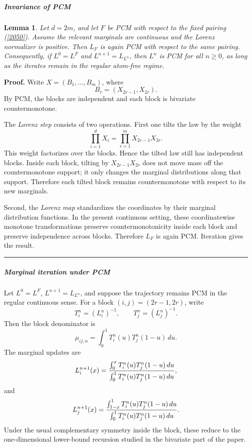 \documentclass[onecolumn]{article}
\newtheorem{lemma}[theorem]{Lemma}
\newenvironment{proof}[1][Proof]{\noindent\textbf{#1.} }{\ \rule{0.5em}{0.5em}}
\begin{document}
\subparagraph{Invariance of PCM}

\begin{lemma}
\noindent \label{PCM-invariance} Let $d=2m$, and let $F$ be PCM with respect
to the fixed pairing (\ref{2050}). Assume the relevant marginals are
continuous and the Lorenz normalizer is positive. Then $L_{F}$ is again PCM
with respect to the same pairing. Consequently, if $L^{0}=L^{F}$ and $%
L^{n+1}=L_{L^{n}}$, then $L^{n}$ is PCM for all $n\geq 0$, as long as the
iterates remain in the regular atom-free regime. \medskip
\end{lemma}

\begin{proof}
Write $X=(B_{1},\ldots ,B_{m})$, where 
\begin{equation*}
B_{r}=(X_{2r-1},X_{2r}).
\end{equation*}%
By PCM, the blocks are independent and each block is bivariate
countermonotone.

The \textit{Lorenz step} consists of two operations. First one tilts the law
by the weight 
\begin{equation*}
\prod_{i=1}^{d}X_{i}=\prod_{r=1}^{m}X_{2r-1}X_{2r}.
\end{equation*}%
This weight factorizes over the blocks. Hence the tilted law still has
independent blocks. Inside each block, tilting by $X_{2r-1}X_{2r}$ does not
move mass off the countermonotone support; it only changes the marginal
distributions along that support. Therefore each tilted block remains
countermonotone with respect to its new marginals.

Second, the \textit{Lorenz map} standardizes the coordinates by their
marginal distribution functions. In the present continuous setting, these
coordinatewise monotone transformations preserve countermonotonicity inside
each block and preserve independence across blocks. Therefore $L_{F}$ is
again PCM. Iteration gives the result.
\end{proof}

\subparagraph{Marginal iteration under PCM}

Let $L^{0}=L^{F}$, $L^{n+1}=L_{L^{n}}$, and suppose the trajectory remains
PCM in the regular continuous sense. For a block $(i,j)=(2r-1,2r)$, write 
\begin{equation*}
T_{i}^{n}=(L_{i}^{n})^{-1},\qquad T_{j}^{n}=(L_{j}^{n})^{-1}.
\end{equation*}%
Then the block denominator is 
\begin{equation*}
\mu _{ij,n}=\int_{0}^{1}T_{i}^{n}(u)T_{j}^{n}(1-u)\,du.
\end{equation*}%
The marginal updates are 
\begin{equation}
L_{i}^{n+1}(x)=\frac{\int_{0}^{x}T_{i}^{n}(u)T_{j}^{n}(1-u)\,du}{%
\int_{0}^{1}T_{i}^{n}(u)T_{j}^{n}(1-u)\,du},  \label{2056a}
\end{equation}%
and 
\begin{equation}
L_{j}^{n+1}(x)=\frac{\int_{1-x}^{1}T_{i}^{n}(u)T_{j}^{n}(1-u)\,du}{%
\int_{0}^{1}T_{i}^{n}(u)T_{j}^{n}(1-u)\,du}.  \label{2056b}
\end{equation}%
Under the usual complementary symmetry inside the block, these reduce to the
one-dimensional lower-bound recursion studied in the bivariate part of the
paper.
\end{document}

